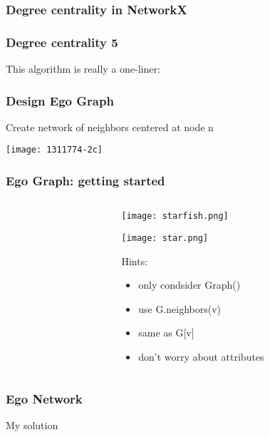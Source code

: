\documentclass[xcolor=dvipsnames, 9pt]{beamer}
\begin{document}
\begin{frame}
\tiny
\frametitle{Degree centrality in NetworkX}

\end{frame}


\begin{frame}
\frametitle{Degree centrality 5}
This algorithm is really a one-liner:

\end{frame}

\begin{frame}
\frametitle{Design Ego Graph}
\centerline{Create network of neighbors centered at node n}
\centerline{\texttt{[image: 1311774-2c]}}
\end{frame}


\begin{frame}
\frametitle{Ego Graph: getting started}
\begin{columns}
\begin{column}{0.6\textwidth}
\small

\end{column}
\begin{column}{0.4\textwidth}
\centerline{\texttt{[image: starfish.png]}}
\centerline{\texttt{[image: star.png]}}

Hints:
\begin{itemize}
\item only condsider Graph()
\item use G.neighbors(v) 
\item same as G[v]
\item don't worry about attributes
\end{itemize}

\end{column}
\end{columns}
\end{frame}

\begin{frame}
\frametitle{Ego Network}

My solution

\end{frame}
\end{document}
